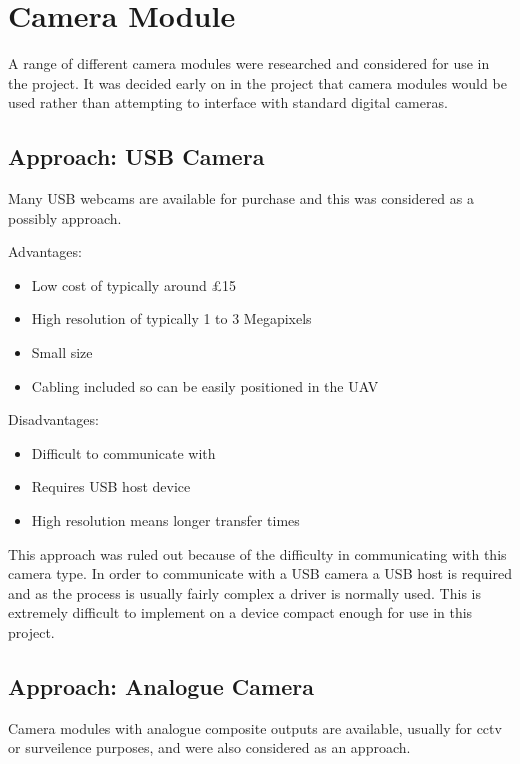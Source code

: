 \section{Camera Module}
\label{sec:John_options}

A range of different camera modules were researched and considered for use in the project. It was decided early on in the project that camera modules would be used rather than attempting to interface with standard digital cameras.

\subsection{Approach: USB Camera}
\label{sec:USB_option}
Many USB webcams are available for purchase and this was considered as a possibly approach.

Advantages:
      \begin{itemize}
         \item Low cost of typically around £15
         \item High resolution of typically 1 to 3 Megapixels
		 \item Small size
		 \item Cabling included so can be easily positioned in the UAV
     \end{itemize}

Disadvantages:
     \begin{itemize}
        \item Difficult to communicate with
        \item Requires USB host device
		\item High resolution means longer transfer times
     \end{itemize}

This approach was ruled out because of the difficulty in communicating with this camera type. In order to communicate with a USB camera a USB host is required and as the process is usually fairly complex a driver is normally used. This is extremely difficult to implement on a device compact enough for use in this project.

\subsection{Approach: Analogue Camera}
\label{sec:Analog_option}
Camera modules with analogue composite outputs are available, usually for cctv or surveilence purposes, and were also considered as an approach.

